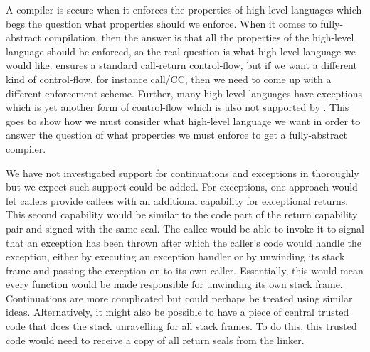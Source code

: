 

\begin{jversion}
  A compiler is secure when it enforces the properties of high-level languages which begs the question what properties should we enforce.
  When it comes to fully-abstract compilation, then the answer is that all the properties of the high-level language should be enforced, so the real question is what high-level language we would like.
  \stktokens{} ensures a standard call-return control-flow, but if we want a different kind of control-flow, for instance call/CC, then we need to come up with a different enforcement scheme.
  Further, many high-level languages have exceptions which is yet another form of control-flow which is also not supported by \stktokens{}.
  This goes to show how we must consider what high-level language we want in order to answer the question of what properties we must enforce to get a fully-abstract compiler.

  We have not investigated support for continuations and exceptions in \stktokens{} thoroughly but we expect such support could be added.
  For exceptions, one approach would let callers provide callees with an additional capability for exceptional returns.
  This second capability would be similar to the code part of the return capability pair and signed with the same seal.
  The callee would be able to invoke it to signal that an exception has been thrown after which the caller's code would handle the exception, either by executing an exception handler or by unwinding its stack frame and passing the exception on to its own caller.
  Essentially, this would mean every function would be made responsible for unwinding its own stack frame.
  Continuations are more complicated but could perhaps be treated using similar ideas.
  Alternatively, it might also be possible to have a piece of central trusted code that does the stack unravelling for all stack frames.
  To do this, this trusted code would need to receive a copy of all return seals from the linker.


\end{jversion}
